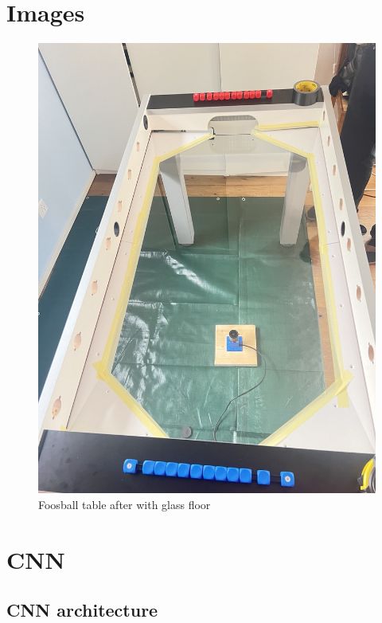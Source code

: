 \section{Images}\label{sec:images}
\begin{figure}[H]
    \centering
    \includegraphics[width=0.7\linewidth]{../photos/glass_table}
    \caption{Foosball table after with glass floor}
    \label{fig:glass_table}
\end{figure}


\section{CNN}\label{sec:cnn}

\subsection{CNN architecture}\label{subsec:cnn-architecture}

